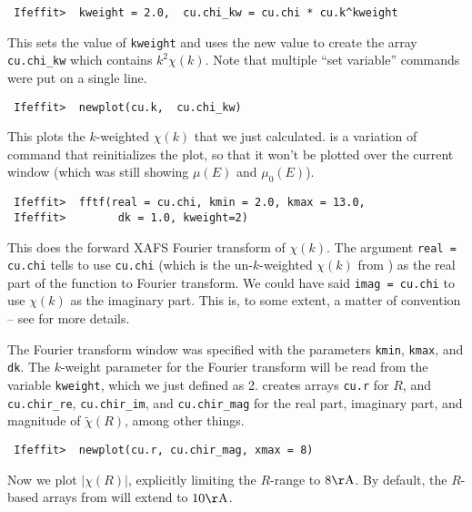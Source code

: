 \begin{verbatim}
 Ifeffit>  kweight = 2.0,  cu.chi_kw = cu.chi * cu.k^kweight
\end{verbatim}
\noindent
This sets the value of {\tt{kweight}} and uses the new value to create the
array {\tt{cu.chi\_kw}} which contains $k^2\chi(k)$.  Note that multiple
``set variable'' commands were put on a single line.

\begin{verbatim}
 Ifeffit>  newplot(cu.k,  cu.chi_kw)
\end{verbatim}
\noindent
This plots the $k$-weighted $\chi(k)$ that we just calculated.
{} is a variation of {} command that reinitializes
the plot, so that it won't be plotted over the current window (which was
still showing $\mu(E)$ and $\mu_0(E)$).

\begin{verbatim}
 Ifeffit>  fftf(real = cu.chi, kmin = 2.0, kmax = 13.0, 
 Ifeffit>        dk = 1.0, kweight=2)
\end{verbatim}\noindent
This does the forward XAFS Fourier transform of $\chi(k)$.  The argument
{\tt{real = cu.chi}} tells {} to use {\tt{cu.chi}} (which is the
un-$k$-weighted $\chi(k)$ from {}) as the real part of the
function to Fourier transform.  We could have said {\tt{imag = cu.chi}} to
use $\chi(k)$ as the imaginary part.  This is, to some extent, a matter of
convention -- see {\XAIBook} for more details.

The Fourier transform window was specified with the parameters {\tt{kmin}},
{\tt{kmax}}, and {\tt{dk}}.  The $k$-weight parameter for the Fourier
transform will be read from the variable {\tt{kweight}}, which we just
defined as 2.  {} creates arrays {\tt{cu.r}} for $R$, and
{\tt{cu.chir\_re}}, {\tt{cu.chir\_im}}, and {\tt{cu.chir\_mag}} for the
real part, imaginary part, and magnitude of $\tilde\chi(R)$, among other
things.

\begin{verbatim}
 Ifeffit>  newplot(cu.r, cu.chir_mag, xmax = 8)
\end{verbatim}\noindent
Now we plot $|\chi(R)|$, explicitly limiting the $R$-range to $8
{\rm{\AA}}$.  By default, the $R$-based arrays from {} will 
extend to $10 {\rm{\AA}}$.

